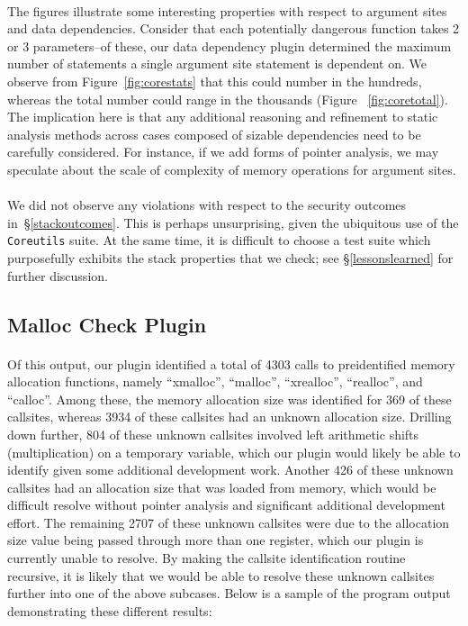 \documentclass[letterpaper,11pt]{article}
\begin{document}
\paragraph{}
The figures illustrate some interesting properties with respect to argument
sites and data dependencies. Consider that each potentially dangerous function
takes 2 or 3 parameters--of these, our data dependency plugin determined the
maximum number of statements a single argument site statement is dependent on.
We observe from Figure~\ref{fig:corestats} that this could number in the hundreds,
whereas the total number could range in the thousands (Figure ~\ref{fig:coretotal}).
The implication here is that any additional reasoning and refinement to static
analysis methods across cases composed of sizable dependencies need to be
carefully considered. For instance, if we add forms of pointer analysis,
we may speculate about the scale of complexity of memory operations for
argument sites.

\paragraph{}
We did not observe any violations with respect to the security outcomes
in~\S\ref{stackoutcomes}. This is perhaps unsurprising, given the ubiquitous
use of the \texttt{Coreutils} suite. At the same time, it is difficult to
choose a test suite which purposefully exhibits the stack properties that we
check; see \S\ref{lessonslearned} for further discussion.

\subsection{Malloc Check Plugin}
\paragraph{}
\paragraph{}
Of this output, our plugin identified a total of 4303 calls to preidentified
memory allocation functions, namely ``xmalloc'', ``malloc'', ``xrealloc'',
``realloc'', and ``calloc''. Among these, the memory allocation size was
identified for 369 of these callsites, whereas 3934 of these callsites had an
unknown allocation size. Drilling down further, 804 of these unknown callsites
involved left arithmetic shifts (multiplication) on a temporary variable, which
our plugin would likely be able to identify given some additional development
work.  Another 426 of these unknown callsites had an allocation size that was
loaded from memory, which would be difficult resolve without pointer analysis
and significant additional development effort. The remaining 2707 of these
unknown callsites were due to the allocation size value being passed through
more than one register, which our plugin is currently unable to resolve. By
making the callsite identification routine recursive, it is likely that we
would be able to resolve these unknown callsites further into one of the above
subcases.  Below is a sample of the program output demonstrating these
different results:
\end{document}
